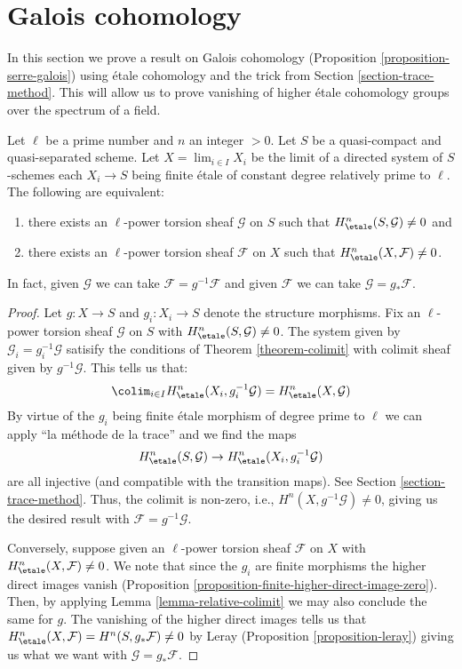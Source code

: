 \section{Galois cohomology}
\label{section-galois-cohomology}

\noindent
In this section we prove a result on Galois cohomology
(Proposition \ref{proposition-serre-galois})
using \'etale cohomology and the trick from
Section \ref{section-trace-method}.
This will allow us to prove vanishing of higher \'etale cohomology groups
over the spectrum of a field.

\begin{lemma}
\label{lemma-nonvanishing-inherited}
Let $\ell$ be a prime number and $n$ an integer $> 0$.
Let $S$ be a quasi-compact and quasi-separated scheme.
Let $X = \lim_{i \in I} X_i$ be the limit of a
directed system of $S$-schemes each $X_i \to S$
being finite \'etale of constant degree relatively prime to $\ell$.
The following are equivalent:
\begin{enumerate}
\item there exists an $\ell$-power torsion sheaf
$\mathcal{G}$ on $S$ such that $H_\etale^n(S, \mathcal{G}) \neq 0$ and
\item there exists an $\ell$-power torsion sheaf $\mathcal{F}$ on $X$
such that $H_\etale^n(X, \mathcal{F}) \neq 0$.
\end{enumerate}
In fact, given
$\mathcal{G}$ we can take $\mathcal{F} = g^{-1}\mathcal{F}$
and given
$\mathcal{F}$ we can take $\mathcal{G} = g_*\mathcal{F}$.
\end{lemma}

\begin{proof}
Let $g : X \to S$ and $g_i : X_i \to S$ denote the structure morphisms.
Fix an $\ell$-power torsion sheaf $\mathcal{G}$ on $S$
with $H^n_\etale(S, \mathcal{G}) \not = 0$.
The system given by $\mathcal{G}_i = g_i^{-1}\mathcal{G}$
satisify the conditions of Theorem \ref{theorem-colimit}
with colimit sheaf given by $g^{-1}\mathcal{G}$. This tells 
us that:
$$
\colim_{i\in I} H^n_\etale(X_i, g_i^{-1}\mathcal{G}) =
H^n_\etale(X, \mathcal{G})
$$
By virtue of the $g_i$ being finite \'etale morphism of degree prime
to $\ell$ we can apply ``la m\'ethode de la trace'' and we find
the maps
$$
H^n_\etale(S, \mathcal{G}) \to H^n_\etale(X_i, g_i^{-1}\mathcal{G})
$$
are all injective (and compatible with the transition maps).
See Section \ref{section-trace-method}. Thus, the colimit is non-zero, i.e.,
$H^n(X,g^{-1}\mathcal{G}) \neq 0$, giving us the desired result with 
$\mathcal{F} = g^{-1}\mathcal{G}$.

\medskip\noindent
Conversely, suppose given an $\ell$-power torsion sheaf $\mathcal{F}$ on $X$
with $H^n_\etale(X, \mathcal{F}) \not = 0$. We note that since the $g_i$
are finite morphisms the higher direct images vanish
(Proposition \ref{proposition-finite-higher-direct-image-zero}).
Then, by applying Lemma \ref{lemma-relative-colimit}
we may also conclude the  same for $g$.
The vanishing of the higher direct images tells us that
$H^n_\etale(X, \mathcal{F}) = H^n(S, g_*\mathcal{F}) \neq 0$
by Leray (Proposition \ref{proposition-leray})
giving us what we want with $\mathcal{G} = g_*\mathcal{F}$.
\end{proof}

